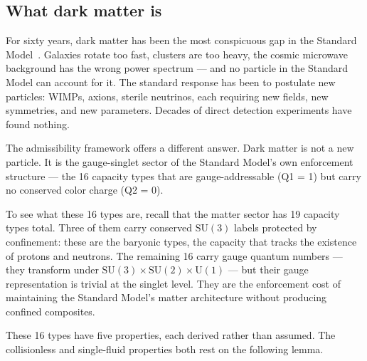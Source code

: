 \documentclass[11pt]{article}
\newcommand{\SU}{\mathrm{SU}}
\newcommand{\U}{\mathrm{U}}
\begin{document}
\subsection{What dark matter is}

For sixty years, dark matter has been the most conspicuous gap in the Standard Model~\cite{BertoneHooper2018}.  Galaxies rotate too fast, clusters are too heavy, the cosmic microwave background has the wrong power spectrum --- and no particle in the Standard Model can account for it.  The standard response has been to postulate new particles: WIMPs, axions, sterile neutrinos, each requiring new fields, new symmetries, and new parameters.  Decades of direct detection experiments have found nothing.

The admissibility framework offers a different answer.  Dark matter is not a new particle.  It is the gauge-singlet sector of the Standard Model's own enforcement structure --- the 16 capacity types that are gauge-addressable (Q1 = 1) but carry no conserved color charge (Q2 = 0).

To see what these 16 types are, recall that the matter sector has 19 capacity types total.  Three of them carry conserved $\SU(3)$ labels protected by confinement: these are the baryonic types, the capacity that tracks the existence of protons and neutrons.  The remaining 16 carry gauge quantum numbers --- they transform under $\SU(3) \times \SU(2) \times \U(1)$ --- but their gauge representation is trivial at the singlet level.  They are the enforcement cost of maintaining the Standard Model's matter architecture without producing confined composites.

These 16 types have five properties, each derived rather than assumed.  The collisionless and single-fluid properties both rest on the following lemma.
\end{document}
